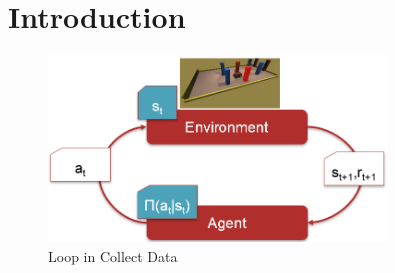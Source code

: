 \chapter{Introduction}
\label{cha:Introduction}

\begin{figure}
    \centering
    \includegraphics[width=0.8\textwidth]{Bilder/rl_cycle.png}
    \caption{Loop in Collect Data}
    \label{fig:unitycommunication}
\end{figure}


